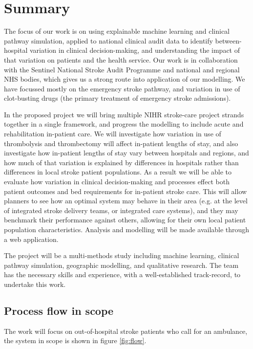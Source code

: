 \section*{Summary}

The focus of our work is on using explainable machine learning and clinical pathway simulation, applied to national clinical audit data to identify between-hospital variation in clinical decision-making, and understanding the impact of that variation on patients and the health service. Our work is in collaboration with the Sentinel National Stroke Audit Programme and national and regional NHS bodies, which gives us a strong route into application of our modelling. We have focussed mostly on the emergency stroke pathway, and variation in use of clot-busting drugs (the primary treatment of emergency stroke admissions).

In the proposed project we will bring multiple NIHR stroke-care project strands together in a single framework, and progress the modelling to include acute and rehabilitation in-patient care. We will investigate how variation in use of thrombolysis and thrombectomy will affect in-patient lengths of stay, and also investigate how in-patient lengths of stay vary between hospitals and regions, and how much of that variation is explained by differences in hospitals rather than differences in local stroke patient populations. As a result we will be able to evaluate how variation in clinical decision-making and processes effect both patient outcomes and bed requirements for in-patient stroke care. This will allow planners to see how an optimal system may behave in their area (e.g. at the level of integrated stroke delivery teams, or integrated care systems), and they may benchmark their performance against others, allowing for their own local patient population characteristics. Analysis and modelling will be made available through a web application.

The project will be a multi-methods study including machine learning, clinical pathway simulation, geographic modelling, and qualitative research. The team has the necessary skills and experience, with a well-established track-record, to undertake this work.

\subsection*{Process flow in scope}

The work will focus on out-of-hospital stroke patients who call for an ambulance, the system in scope is shown in figure \ref{fig:flow}.

